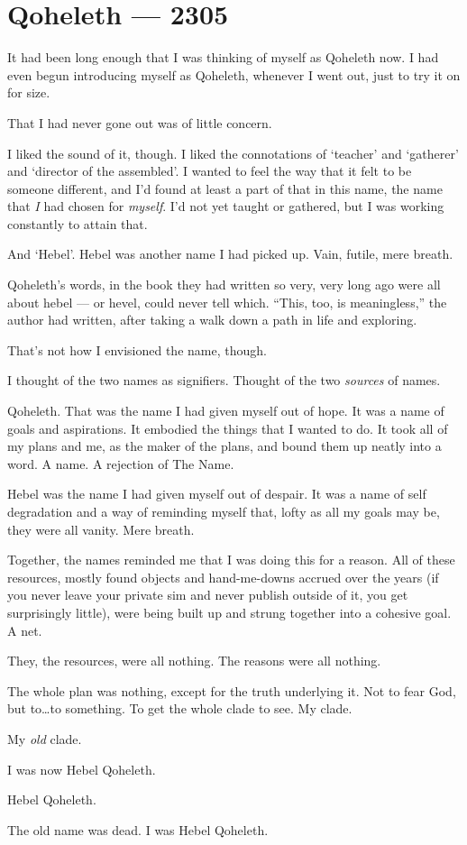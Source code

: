 \hypertarget{qoheleth-2305}{%
\chapter*{Qoheleth --- 2305}\label{qoheleth-2305}}

It had been long enough that I was thinking of myself as Qoheleth now. I had even begun introducing myself as Qoheleth, whenever I went out, just to try it on for size.

That I had never gone out was of little concern.

I liked the sound of it, though. I liked the connotations of `teacher' and `gatherer' and `director of the assembled'. I wanted to feel the way that it felt to be someone different, and I'd found at least a part of that in this name, the name that \emph{I} had chosen for \emph{myself}. I'd not yet taught or gathered, but I was working constantly to attain that.

And `Hebel'. Hebel was another name I had picked up. Vain, futile, mere breath.

Qoheleth's words, in the book they had written so very, very long ago were all about hebel --- or hevel, could never tell which. ``This, too, is meaningless,'' the author had written, after taking a walk down a path in life and exploring.

That's not how I envisioned the name, though.

I thought of the two names as signifiers. Thought of the two \emph{sources} of names.

Qoheleth. That was the name I had given myself out of hope. It was a name of goals and aspirations. It embodied the things that I wanted to do. It took all of my plans and me, as the maker of the plans, and bound them up neatly into a word. A name. A rejection of The Name.

Hebel was the name I had given myself out of despair. It was a name of self degradation and a way of reminding myself that, lofty as all my goals may be, they were all vanity. Mere breath.

Together, the names reminded me that I was doing this for a reason. All of these resources, mostly found objects and hand-me-downs accrued over the years (if you never leave your private sim and never publish outside of it, you get surprisingly little), were being built up and strung together into a cohesive goal. A net.

They, the resources, were all nothing. The reasons were all nothing.

The whole plan was nothing, except for the truth underlying it. Not to fear God, but to\ldots{}to something. To get the whole clade to see. My clade.

My \emph{old} clade.

I was now Hebel Qoheleth.

Hebel Qoheleth.

The old name was dead. I was Hebel Qoheleth.
